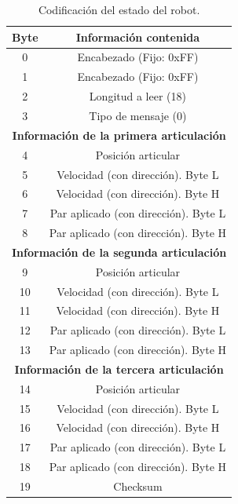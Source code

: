 \begin{table}[htbp]
\centering
\caption{Codificación del estado del robot.}
\label{tab:robot_state}
\begin{center}
	\begin{tabular}{|c|c|}
	\hline
	\textbf{Byte} & \textbf{Información contenida} \\
	\hline
	0 & Encabezado (Fijo: 0xFF) \\
	\hline
	1 & Encabezado (Fijo: 0xFF) \\
	\hline
	2 & Longitud a leer (18) \\
	\hline
	3 & Tipo de mensaje (0) \\
	\hline
	\multicolumn{2}{|c|}{\textbf{Información de la primera articulación}} \\
	\hline
	4 & Posición articular \\
	\hline
	5 & Velocidad (con dirección). Byte L \\
	\hline
	6 & Velocidad (con dirección). Byte H \\
	\hline
	7 & Par aplicado (con dirección). Byte L \\
	\hline
	8 & Par aplicado (con dirección). Byte H \\
	\hline
	\multicolumn{2}{|c|}{\textbf{Información de la segunda articulación}} \\
	\hline
	9 & Posición articular \\
	\hline
	10 & Velocidad (con dirección). Byte L \\
	\hline
	11 & Velocidad (con dirección). Byte H \\
	\hline
	12 & Par aplicado (con dirección). Byte L \\
	\hline
	13 & Par aplicado (con dirección). Byte H \\
	\hline
	\multicolumn{2}{|c|}{\textbf{Información de la tercera articulación}} \\
	\hline
	14 & Posición articular \\
	\hline
	15 & Velocidad (con dirección). Byte L \\
	\hline
	16 & Velocidad (con dirección). Byte H \\
	\hline
	17 & Par aplicado (con dirección). Byte L \\
	\hline
	18 & Par aplicado (con dirección). Byte H \\
	\hline
	19 & Checksum \\
	\hline
	\end{tabular}
\end{center}
\end{table}


